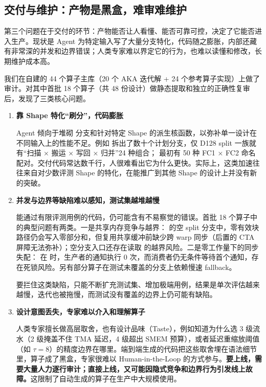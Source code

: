 \subsection{交付与维护：产物是黑盒，难审难维护}\label{sec:challenge-delivery}
第三个问题在于交付的环节：产物能否让人看懂、能否可靠可控，决定了它能否进入生产。现状是 Agent 为特定输入写了大量分支特化，代码随之膨胀，内部还藏有非常深的并发和边界错误；人类专家难以界定它的行为，也难以读懂和修改，长期维护成本高。


我们在自建的 44 个算子主库（20 个 AKA 迭代解 + 24 个参考算子实现）上做了审计。对其中首批 18 个算子（共 48 份设计）做静态提取和独立的正确性复审后，发现了三类核心问题。


\begin{enumerate}[start=1]
\item
\textbf{靠 Shape 特化“刷分”，代码膨胀}


Agent 倾向于堆砌  分支和针对特定 Shape 的派生核函数，以弥补单一设计在不同输入上的性能不足。例如  拆出了数十个计划分支，仅 D128 split 一族就有“扫描 × 搬运 × 写回 × 归并”24 种组合； 最初有 50 种 FC1 × FC2 命名配对。交付代码常达数千行，人很难看出它为什么更快。实际上，这类加速往往来自对少数评测 Shape 的特化，在能推广到其他 Shape 的设计上并没有新的突破。


\item
\textbf{并发与边界等缺陷难以感知，测试集越堆越慢}


能通过有限评测用例的代码，仍可能含有不易察觉的错误。首批 18 个算子中的典型问题有两类。一是共享内存竞争与越界： 的空 split 分支中，零有效块路径仍会写入零部分和，但复用共享缓冲前缺少跨 warp 同步（后置的 CTA 屏障无法弥补）；空分支入口还存在读取  的越界风险。二是零工作量下的同步失配： 在  时，生产者的通知执行 0 次，而消费者仍无条件等待首个通知，存在死锁风险。另有部分算子在测试未覆盖的分支上依赖慢速 fallback。

要拦住这类缺陷，只能不断扩充测试集、增加极端用例，结果是单次评估越来越慢，迭代也被拖慢，而测试没有覆盖的边界上仍可能有缺陷。


\item
\textbf{设计意图丢失，专家难以介入和理解算子}


人类专家擅长做高层取舍，也有设计品味（Taste），例如知道为什么选 3 级流水（2 级掩盖不住 TMA 延迟，4 级超出 SMEM 预算），或者延迟重缩放阈值（如 $\tau=8$）的精度边界在哪里。端到端生成的代码把这些取舍埋在语法细节里，算子成了黑盒，专家很难以 Human-in-the-Loop 的方式参与。\textbf{要上线，需要大量人力逐行审计；直接上线，又可能因隐式竞争和边界行为引发线上故障。}这限制了自动生成的算子在生产中大规模使用。


\end{enumerate}
\SourceSeparator
\clearpage
